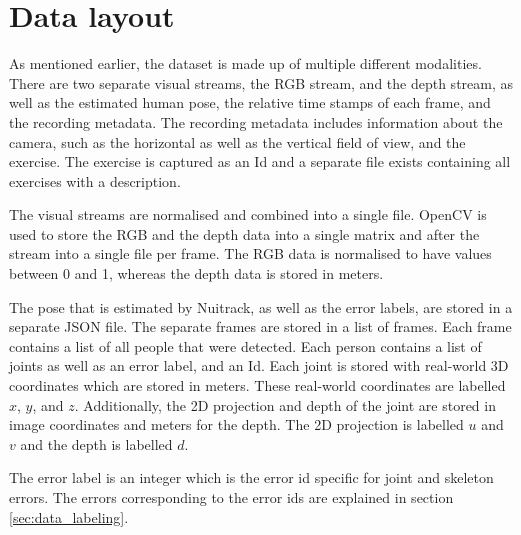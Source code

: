 \section{Data layout}

As mentioned earlier, the dataset is made up of multiple different modalities. There are two separate visual streams, the RGB stream, and the depth stream, as well as the estimated human pose, the relative time stamps of each frame, and the recording metadata. The recording metadata includes information about the camera, such as the horizontal as well as the vertical field of view, and the exercise. The exercise is captured as an Id and a separate file exists containing all exercises with a description.

The visual streams are normalised and combined into a single file. OpenCV is used to store the RGB and the depth data into a single matrix and after the stream into a single file per frame. The RGB data is normalised to have values between 0 and 1, whereas the depth data is stored in meters.

The pose that is estimated by Nuitrack, as well as the error labels, are stored in a separate JSON file. The separate frames are stored in a list of frames. Each frame contains a list of all people that were detected. Each person contains a list of joints as well as an error label, and an Id. Each joint is stored with real-world 3D coordinates which are stored in meters. These real-world coordinates are labelled $x$, $y$, and $z$. Additionally, the 2D projection and depth of the joint are stored in image coordinates and meters for the depth. The 2D projection is labelled $u$ and $v$ and the depth is labelled $d$. 

The error label is an integer which is the error id specific for joint and skeleton errors. The errors corresponding to the error ids are explained in section \ref{sec:data_labeling}.
